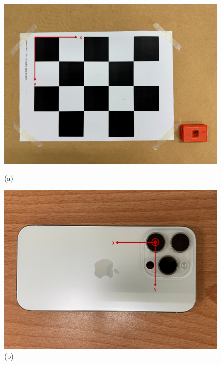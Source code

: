 \begin{figure}[!ht]
   \centering
   \begin{minipage}{.5\textwidth}
      \centering
      \includegraphics[width=\linewidth]{figure/ch3_fig_cbframe.png}
      \caption*{(a)}
   \end{minipage}%
   \vspace{5mm}%
   \begin{minipage}{.5\textwidth}
      \centering
      \includegraphics[width=\linewidth]{figure/ch3_fig_camframe.png}
      \caption*{(b)}
   \end{minipage}
   \begin{minipage}{.5\textwidth}
     \centering

\end{minipage}
\end{figure}
